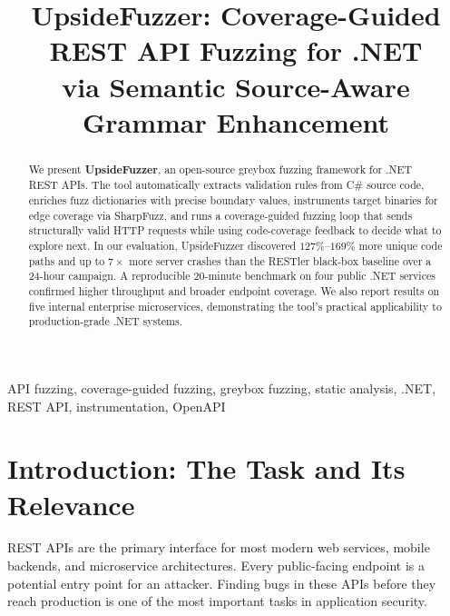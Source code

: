 \documentclass[conference]{IEEEtran}
\begin{document}
\title{UpsideFuzzer: Coverage-Guided REST API Fuzzing for .NET\\
via Semantic Source-Aware Grammar Enhancement}

\author{
}

\maketitle

\begin{abstract}
We present \textbf{UpsideFuzzer}, an open-source greybox fuzzing framework for .NET REST APIs. The tool automatically extracts validation rules from C\# source code, enriches fuzz dictionaries with precise boundary values, instruments target binaries for edge coverage via SharpFuzz, and runs a coverage-guided fuzzing loop that sends structurally valid HTTP requests while using code-coverage feedback to decide what to explore next. In our evaluation, UpsideFuzzer discovered $127\%$--$169\%$ more unique code paths and up to $7\times$ more server crashes than the RESTler black-box baseline over a 24-hour campaign. A reproducible 20-minute benchmark on four public .NET services confirmed higher throughput and broader endpoint coverage. We also report results on five internal enterprise microservices, demonstrating the tool's practical applicability to production-grade .NET systems.
\end{abstract}

\begin{IEEEkeywords}
API fuzzing, coverage-guided fuzzing, greybox fuzzing, static analysis, .NET, REST API, instrumentation, OpenAPI
\end{IEEEkeywords}

\section{Introduction: The Task and Its Relevance}
\label{sec:intro}

REST APIs are the primary interface for most modern web services, mobile backends, and microservice architectures. Every public-facing endpoint is a potential entry point for an attacker. Finding bugs in these APIs before they reach production is one of the most important tasks in application security.
\end{document}
